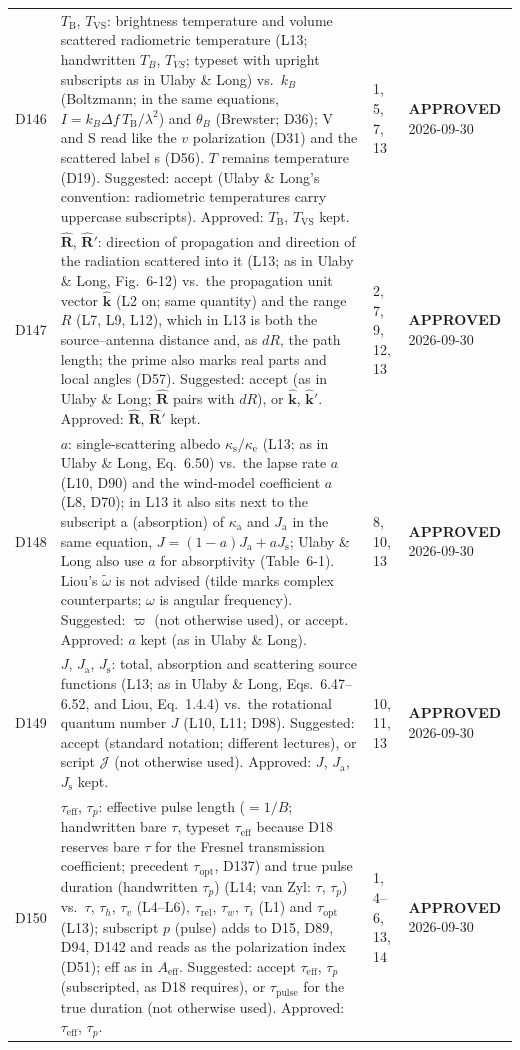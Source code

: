 \documentclass[11pt, oneside]{article}
\newcommand{\approved}{\textbf{APPROVED}}
\begin{document}
\begin{longtable}{l >{\raggedright\arraybackslash}p{} l l}
D146 & $T_\mathrm{B}$, $T_\mathrm{VS}$: brightness temperature and volume scattered radiometric temperature (L13; handwritten $T_B$, $T_{VS}$; typeset with upright subscripts as in Ulaby \& Long) vs.\ $k_B$ (Boltzmann; in the same equations, $I = k_B\Delta f\,T_\mathrm{B}/\lambda^2$) and $\theta_B$ (Brewster; D36); V and S read like the $v$ polarization (D31) and the scattered label s (D56). $T$ remains temperature (D19). Suggested: accept (Ulaby \& Long's convention: radiometric temperatures carry uppercase subscripts). Approved: $T_\mathrm{B}$, $T_\mathrm{VS}$ kept. & 1, 5, 7, 13 & \approved{} 2026-09-30 \\
D147 & $\hat{\mathbf{R}}$, $\hat{\mathbf{R}}'$: direction of propagation and direction of the radiation scattered into it (L13; as in Ulaby \& Long, Fig.~6-12) vs.\ the propagation unit vector $\hat{\mathbf{k}}$ (L2 on; same quantity) and the range $R$ (L7, L9, L12), which in L13 is both the source--antenna distance and, as $dR$, the path length; the prime also marks real parts and local angles (D57). Suggested: accept (as in Ulaby \& Long; $\hat{\mathbf{R}}$ pairs with $dR$), or $\hat{\mathbf{k}}$, $\hat{\mathbf{k}}'$. Approved: $\hat{\mathbf{R}}$, $\hat{\mathbf{R}}'$ kept. & 2, 7, 9, 12, 13 & \approved{} 2026-09-30 \\
D148 & $a$: single-scattering albedo $\kappa_\mathrm{s}/\kappa_\mathrm{e}$ (L13; as in Ulaby \& Long, Eq.~6.50) vs.\ the lapse rate $a$ (L10, D90) and the wind-model coefficient $a$ (L8, D70); in L13 it also sits next to the subscript a (absorption) of $\kappa_\mathrm{a}$ and $J_\mathrm{a}$ in the same equation, $J = (1-a)J_\mathrm{a} + aJ_\mathrm{s}$; Ulaby \& Long also use $a$ for absorptivity (Table~6-1). Liou's $\tilde{\omega}$ is not advised (tilde marks complex counterparts; $\omega$ is angular frequency). Suggested: $\varpi$ (not otherwise used), or accept. Approved: $a$ kept (as in Ulaby \& Long). & 8, 10, 13 & \approved{} 2026-09-30 \\
D149 & $J$, $J_\mathrm{a}$, $J_\mathrm{s}$: total, absorption and scattering source functions (L13; as in Ulaby \& Long, Eqs.~6.47--6.52, and Liou, Eq.~1.4.4) vs.\ the rotational quantum number $J$ (L10, L11; D98). Suggested: accept (standard notation; different lectures), or script $\mathcal{J}$ (not otherwise used). Approved: $J$, $J_\mathrm{a}$, $J_\mathrm{s}$ kept. & 10, 11, 13 & \approved{} 2026-09-30 \\
D150 & $\tau_\mathrm{eff}$, $\tau_p$: effective pulse length ($=1/B$; handwritten bare $\tau$, typeset $\tau_\mathrm{eff}$ because D18 reserves bare $\tau$ for the Fresnel transmission coefficient; precedent $\tau_\mathrm{opt}$, D137) and true pulse duration (handwritten $\tau_p$) (L14; van Zyl: $\tau$, $\tau_p$) vs.\ $\tau$, $\tau_h$, $\tau_v$ (L4--L6), $\tau_\mathrm{rel}$, $\tau_w$, $\tau_i$ (L1) and $\tau_\mathrm{opt}$ (L13); subscript $p$ (pulse) adds to D15, D89, D94, D142 and reads as the polarization index (D51); eff as in $A_\mathrm{eff}$. Suggested: accept $\tau_\mathrm{eff}$, $\tau_p$ (subscripted, as D18 requires), or $\tau_\mathrm{pulse}$ for the true duration (not otherwise used). Approved: $\tau_\mathrm{eff}$, $\tau_p$. & 1, 4--6, 13, 14 & \approved{} 2026-09-30 \\

\end{longtable}
\end{document}
